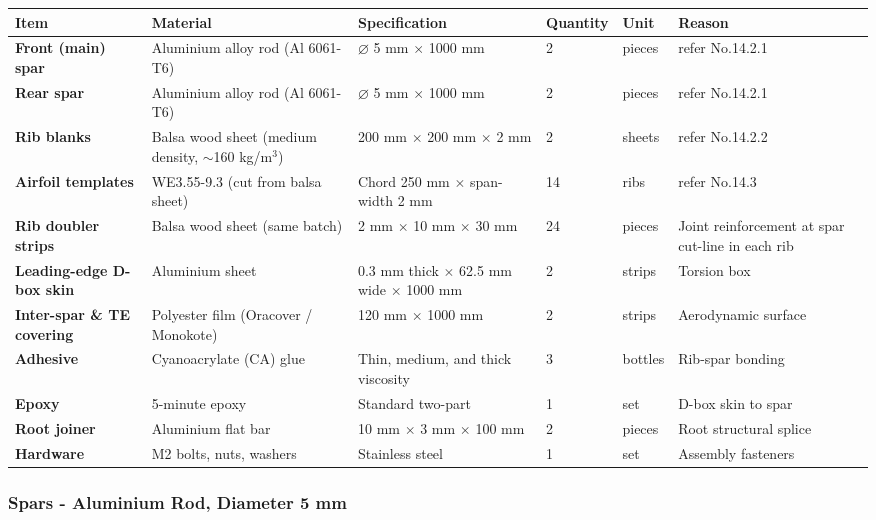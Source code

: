 \documentclass[10pt,a4paper]{article}
\begin{document}
\begin{landscape}
\begin{center}
\renewcommand{\arraystretch}{1.2}
\begin{tabularx}{\linewidth}{|p{3cm}|p{3cm}|p{4cm}|p{1.5cm}|p{1.5cm}|X|}
\hline
Item & Material & Specification & Quantity & Unit & Reason \\
\hline
\textbf{Front (main) spar} & Aluminium alloy rod (Al 6061-T6) & $\varnothing$ 5 mm $\times$ 1000 mm & 2 & pieces & refer No.14.2.1 \\
\hline
\textbf{Rear spar} & Aluminium alloy rod (Al 6061-T6) & $\varnothing$ 5 mm $\times$ 1000 mm & 2 & pieces & refer No.14.2.1 \\
\hline
\textbf{Rib blanks} & Balsa wood sheet (medium density, $\sim$160 kg/m$^{3}$) & 200 mm $\times$ 200 mm $\times$ 2 mm & 2 & sheets & refer No.14.2.2 \\
\hline
\textbf{Airfoil templates} & WE3.55-9.3 (cut from balsa sheet) & Chord 250 mm $\times$ span-width 2 mm & 14 & ribs & refer No.14.3 \\
\hline
\textbf{Rib doubler strips} & Balsa wood sheet (same batch) & 2 mm $\times$ 10 mm $\times$ 30 mm & 24 & pieces & Joint reinforcement at spar cut-line in each rib \\
\hline
\textbf{Leading-edge D-box skin} & Aluminium sheet & 0.3 mm thick $\times$ 62.5 mm wide $\times$ 1000 mm & 2 & strips & Torsion box \\
\hline
\textbf{Inter-spar \& TE covering} & Polyester film (Oracover / Monokote) & 120 mm $\times$ 1000 mm & 2 & strips & Aerodynamic surface \\
\hline
\textbf{Adhesive} & Cyanoacrylate (CA) glue & Thin, medium, and thick viscosity & 3 & bottles & Rib-spar bonding \\
\hline
\textbf{Epoxy} & 5-minute epoxy & Standard two-part & 1 & set & D-box skin to spar \\
\hline
\textbf{Root joiner} & Aluminium flat bar & 10 mm $\times$ 3 mm $\times$ 100 mm & 2 & pieces & Root structural splice \\
\hline
\textbf{Hardware} & M2 bolts, nuts, washers & Stainless steel & 1 & set & Assembly fasteners \\
\hline
\end{tabularx}
\end{center}
\end{landscape}

\subsubsection{Spars - Aluminium Rod, Diameter 5 mm}
\end{document}
